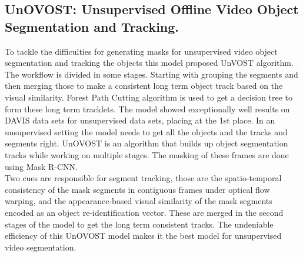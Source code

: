 \documentclass[conference]{IEEEtran}
\begin{document}
\subsection{UnOVOST: Unsupervised Offline Video Object Segmentation and Tracking.} To tackle the difficulties for generating masks for unsupervised video object segmentation and tracking the objects this model proposed UnVOST\cite{Luiten_2020_WACV} algorithm. The workflow is divided in some stages. Starting with grouping the segments and then merging those to make a consistent long term object track based on the visual similarity. Forest Path Cutting algorithm is used to get a decision tree to form these long term tracklets. The model showed exceptionally well results on DAVIS data sets for unsupervised data sets, placing at the 1st place.
In an unsupervised setting the model needs to get all the objects and the tracks and segments right. UnOVOST is an algorithm that builds up object segmentation tracks while working on multiple stages. The masking of these frames are done using Mask R-CNN\cite{he2017mask}.\\
Two cues are responsible for segment tracking, those are the spatio-temporal consistency of the mask
segments in contiguous frames under optical flow warping,
and the appearance-based visual similarity of the mask segments encoded as an object re-identification vector. These are merged in the second stages of the model to get the long term consistent tracks.
The undeniable efficiency of this UnOVOST model makes it the best model for unsupervised video segmentation. 
\end{document}
